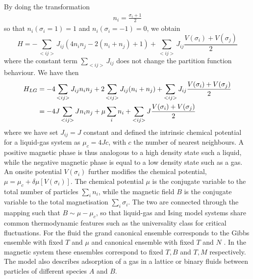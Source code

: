 By doing the transformation\cite{goldenfeld_lectures_2018} 
\begin{align}
    n_i =  \frac{\sigma_i +1}{2}
\end{align}
so that $n_i(\sigma_i = 1) = 1$ and $n_i(\sigma_i = -1) = 0$, we obtain
\begin{equation}
	H =  - \sum_{< i j >}  J_{ij} \left( 4 n_i n_j -2 ( n_i+n_j) + 1 \right)+ \sum_{< i j >}  J_{ij} \frac{V(\sigma_i)+V(\sigma_j)}{2}  
\end{equation}
where the constant term $\sum_{< i j >}  J_{ij}$ does not change the partition function behaviour. We have then
\begin{align}
	H_{LG} &=  - 4 \sum_{< i j >}  J_{ij}  n_i n_j  + 2 \sum_{< i j >}  J_{ij}  (n_i+n_j) + \sum_{< i j >}  J_{ij} \frac{V(\sigma_i)+V(\sigma_j)}{2}  \nonumber \\
       &=  - 4 J \sum_{< i j >}  J n_i n_j  + \mu \sum_i  n_i + \sum_{< i j >}  J \frac{V(\sigma_i)+V(\sigma_j)}{2}  
\end{align}
where we have set $J_{ij} = J$ constant and defined the intrinsic chemical potential for a liquid-gas system as $\mu_c=4J c$, with  $c$ the number of nearest neighbours. A positive magnetic phase is thus analogous to a high density state such a liquid, while the negative magnetic phase is equal to a low density state such as a gas. An onsite potential $V(\sigma_i)$ further modifies the chemical potential, $\mu=\mu_c+\delta\mu[V(\sigma_i)]$.
The chemical potential $\mu$ is the conjugate variable to the total number of particles $\sum_i n_i$, while the magnetic field $B$ is the conjugate variable to the total magnetisation $\sum_i \sigma_i$. The two are connected through the mapping such that $B\sim \mu-\mu_c$, so that liquid-gas and Ising model systems share common thermodynamic features such as the universality class for critical fluctuations. For the fluid the grand canonical ensemble corresponds to the Gibbs ensemble with fixed $T$ and $\mu$ and canonical ensemble with fixed $T$ and $N$ . In the magnetic system these ensembles correspond to fixed $T, B$ and $T,M$ respectively. The model also describes adsorption of a gas in a lattice or binary fluids between particles of different species $A$ and $B$.



